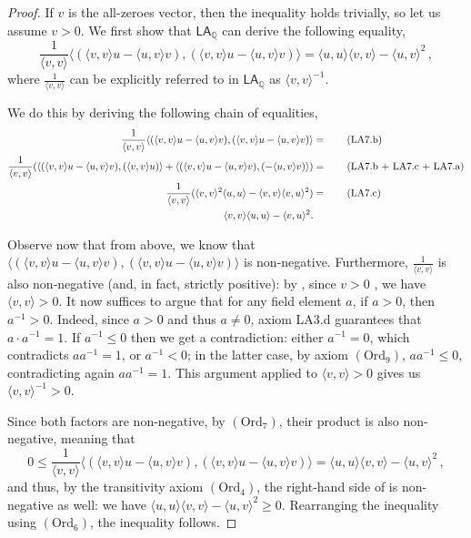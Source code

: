 \documentclass[11pt]{article}
\newcommand{\LAQ}{\mathsf{LA}_\mathbb{Q}}
\theoremstyle{definition}
\theoremstyle{plain}
\theoremstyle{remark}
\begin{document}
\begin{proof}
If $v$ is the all-zeroes vector, then the inequality holds trivially, so let us assume $v > 0$.
We first show that $\LAQ$ can derive the following equality, 
\begin{equation}
\label{eq:CS}
        \frac{1}{\langle v,v\rangle}\langle(\langle v,v\rangle u-\langle u,v\rangle v), (\langle v,v\rangle u -\langle  u,v\rangle v)\rangle=\langle u,u\rangle\langle v ,v\rangle - \langle u,v\rangle^2 \,,
\end{equation}
where $\frac{1}{\langle v,v\rangle}$ can be explicitly referred to in $\LAQ$ as $\langle v,v\rangle^{-1}$.

We do this by deriving the following chain of equalities,
\begin{align}
       \frac{1}{\langle v ,v\rangle}\langle(\langle v ,v\rangle u-\langle  u,v\rangle v), (\langle v ,v\rangle u-\langle  u,v\rangle v)\rangle &=  \tag{\text{LA7.b}} \\   
     \frac{1}{\langle v,v\rangle}(\langle(\langle v ,v\rangle u-\langle  u,v\rangle v), (\langle v ,v\rangle u)\rangle + \langle(\langle v ,v\rangle u-\langle  u,v\rangle v), (-\langle  u,v\rangle v)\rangle) &= \tag{\text{LA7.b + LA7.c + LA7.a}} \\
\frac{1}{\langle v,v\rangle}(\langle v,v\rangle^2 \langle  u, u\rangle - \langle v,v\rangle\langle v ,u\rangle^2) &= \tag{\text{LA7.c}} \\
 \langle v,v\rangle \langle u, u\rangle - \langle v,u\rangle^2 \notag.
\end{align}

Observe now that from  above, we know that $\langle(\langle v,v\rangle u-\langle u,v\rangle v), (\langle v,v\rangle u -\langle  u,v\rangle v)\rangle$ is non-negative. Furthermore, $ \frac{1}{\langle v ,v\rangle}$ is also non-negative (and, in fact, strictly positive): by , since $v > 0$ , we have $\langle v ,v\rangle > 0$. It now suffices to argue that for any field element $a$, if $a >0$, then $a^{-1} > 0$. Indeed, since $a >0$ and thus $a \neq 0$, axiom LA3.d guarantees that $a \cdot a^{-1} = 1$. If $a^{-1} \leq 0$ then we get a contradiction: either $a^{-1} = 0$, which contradicts $aa^{-1} = 1$, or $a^{-1} < 0$; in the latter case, by axiom $(\text{Ord}_9)$, $aa^{-1} \leq 0$, contradicting again $aa^{-1} = 1$. This argument applied to $\langle v, v \rangle > 0$ gives us  $\langle v ,v\rangle^{-1} > 0$.

Since both factors are non-negative, by $(\text{Ord}_7)$, their product is also non-negative, meaning that
\begin{equation*}
   0 \leq  \frac{1}{\langle v,v\rangle}\langle(\langle v,v\rangle u-\langle u,v\rangle v), (\langle v,v\rangle u -\langle  u,v\rangle v)\rangle=\langle u,u\rangle\langle v ,v\rangle - \langle u,v\rangle^2 \,,
\end{equation*}
and thus, by the transitivity axiom $(\text{Ord}_4)$, the right-hand side of  is non-negative as well: we have $\langle u,u\rangle\langle v ,v\rangle - \langle u,v\rangle^2 \geq 0$. Rearranging the inequality using $(\text{Ord}_6)$, the inequality follows.
\end{proof}
\end{document}
